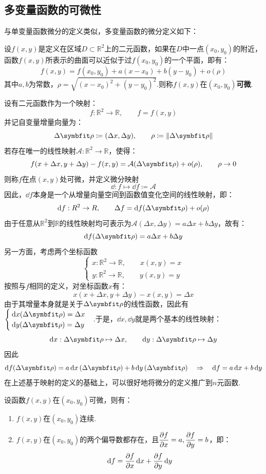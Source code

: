 \subsection{多变量函数的可微性}
与单变量函数微分的定义类似，多变量函数的微分定义如下：
\begin{definition}
    设$f(x,y)$是定义在区域$D \subset \mathbb{R}^2$上的二元函数，如果在$D$中一点$(x_0,y_0)$的附近，函数$f(x,y)$所表示的曲面可以近似于过$f(x_0,y_0)$的一个平面，即有：
    \[f(x,y) = f(x_0,y_0) + a(x-x_0) + b(y-y_0) + o(\rho)\]
    其中$a,b$为常数，$\rho = \sqrt{(x-x_0)^2 + (y-y_0)^2}$.则称$f(x,y)$在$(x_0,y_0)$\textbf{可微}.
\end{definition}

设有二元函数作为一个映射：
\[f:\mathbb R^2\to\mathbb R,\qquad f=f(x,y)\]
并记自变量增量向量为：
\[\Delta\vb{\rho} \coloneq (\Delta x,\Delta y),\qquad \rho\coloneq\left\|\Delta\vb{\rho}\right\|\]
若存在唯一的线性映射$\mathcal A:\mathbb R^2\to\mathbb R$，使得：
\[f(x+\Delta x,y+\Delta y)-f(x,y) = \mathcal A(\Delta\vb{\rho})+o(\rho),\qquad\rho\to0\]
则称$f$在点$(x,y)$处可微，并定义微分映射
\[\dd: f\longmapsto \dd f\coloneq\mathcal A\]
因此，$\dd{f}$本身是一个从增量向量空间到函数值变化空间的线性映射，即：
\[\dd f:\mathbb R^2\to\mathbb R,\qquad\Delta f = \dd f(\Delta\vb{\rho})+o(\rho)\]
由于任意从$\mathbb R^2$到$\mathbb R$的线性映射均可表示为$\mathcal A(\Delta x,\Delta y) = a\Delta x+b\Delta y$，故有：
\[\dd f(\Delta\vb{\rho}) = a\Delta x+b\Delta y\]
另一方面，考虑两个坐标函数
\[\begin{cases}
    x:\mathbb R^2\to\mathbb R,\qquad x(x,y)=x\\
    y:\mathbb R^2\to\mathbb R,\qquad y(x,y)=y
\end{cases}\]
按照与$f$相同的定义，对坐标函数$x$有：
\[x(x+\Delta x,y+\Delta y)-x(x,y)=\Delta x\]
由于其增量本身就是关于$\Delta\vb{\rho}$的线性函数，因此有$\begin{cases}
    \dd x(\Delta\vb{\rho}) = \Delta x \\
    \dd y(\Delta\vb{\rho}) = \Delta y
\end{cases}$.于是，$\dd x,\dd y$就是两个基本的线性映射：
\[\dd x:\Delta\vb{\rho}\mapsto\Delta x,\qquad\dd y:\Delta\vb{\rho}\mapsto\Delta y\]
因此
\[\dd f(\Delta\vb{\rho})=a\dd{x}(\Delta\vb{\rho})+b\dd{y}(\Delta\vb{\rho}) \quad\Rightarrow\quad \dd{f} = a\dd{x} + b\dd{y}\]
在上述基于映射的定义的基础上，可以很好地将微分的定义推广到$n$元函数.

\begin{theorem}
    设函数$f(x,y)$在$(x_0,y_0)$可微，则有：
    \begin{enumerate}[circ]
        \item $f(x,y)$在$(x_0,y_0)$连续.
        \item $f(x,y)$在$(x_0,y_0)$的两个偏导数都存在，且$\displaystyle\pdv{f}{x}=a,\pdv{f}{y}=b$，即：
        \[\dd{f} = \pdv{f}{x}\dd{x} + \pdv{f}{y}\dd{y}\]
    \end{enumerate}
\end{theorem}

